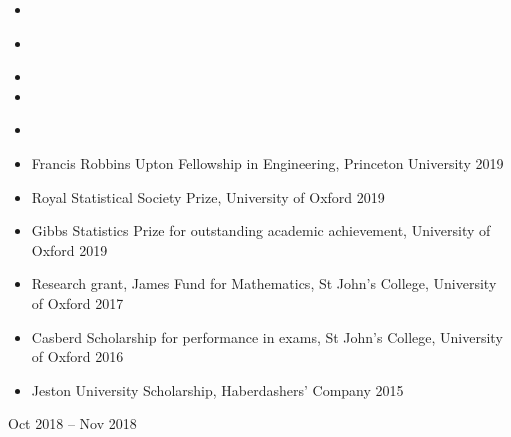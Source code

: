 \documentclass[
  date,
  number,
]{wgu-cv}
\begin{document}
\begin{itemize}
	\item {}
\end{itemize}

\begin{itemize}
\item {}
\end{itemize}

\begin{itemize}
  \item {}
  \item {}
\end{itemize}


\begin{itemize}
  \item {}
\end{itemize}


\pagebreak

\begin{itemize}
  \item Francis Robbins Upton Fellowship in Engineering,
    Princeton University
    \hfill 2019%
  \item Royal Statistical Society Prize,
    University of Oxford
    \hfill 2019%
  \item Gibbs Statistics Prize for outstanding academic achievement,
    University of Oxford
    \hfill 2019%
	\item Research grant, James Fund for Mathematics,
    St John's College, University of Oxford
    \hfill 2017%
	\item Casberd Scholarship for performance in exams,
    St John's College, University of Oxford
    \hfill 2016%
  \item Jeston University Scholarship,
    Haberdashers' Company
    \hfill 2015%
\end{itemize}




{}
{Oct 2018 -- Nov 2018}
\end{document}

